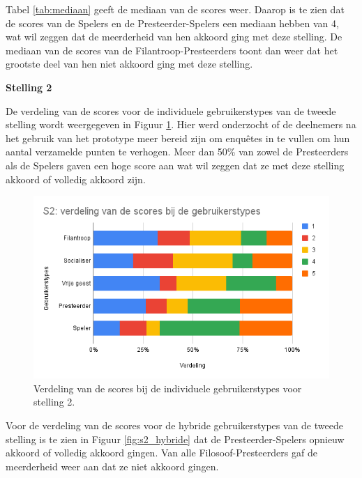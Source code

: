 Tabel \ref{tab:mediaan} geeft de mediaan van de scores weer. Daarop is te zien dat de scores van de Spelers en de Presteerder-Spelers een mediaan hebben van 4, wat wil zeggen dat de meerderheid van hen akkoord ging met deze stelling. De mediaan van de scores van de Filantroop-Presteerders toont dan weer dat het grootste deel van hen niet akkoord ging met deze stelling.

\textbf{Stelling 2}

De verdeling van de scores voor de individuele gebruikerstypes van de tweede stelling wordt weergegeven in Figuur \ref{fig:s2}. Hier werd onderzocht of de deelnemers na het gebruik van het prototype meer bereid zijn om enquêtes in te vullen om hun aantal verzamelde punten te verhogen. Meer dan 50\% van zowel de Presteerders als de Spelers gaven een hoge score aan wat wil zeggen dat ze met deze stelling akkoord of volledig akkoord zijn.

\begin{figure}
    \includegraphics[width=\linewidth]{S2.png}
    \caption{Verdeling van de scores bij de individuele gebruikerstypes voor stelling 2.}
    \label{fig:s2}
\end{figure}

Voor de verdeling van de scores voor de hybride gebruikerstypes van de tweede stelling is te zien in Figuur \ref{fig:s2_hybride} dat de Presteerder-Spelers opnieuw akkoord of volledig akkoord gingen. Van alle Filosoof-Presteerders gaf de meerderheid weer aan dat ze niet akkoord gingen.


